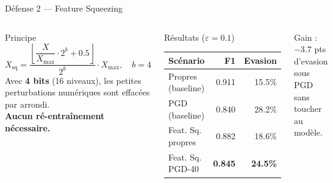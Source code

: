 \documentclass[aspectratio=169,11pt]{beamer}
\begin{document}
\begin{frame}{D\'efense 2 --- Feature Squeezing}
\begin{columns}[T]
\begin{exampleblock}{Principe}
\[
X_{\text{sq}} = \frac{\left\lfloor \dfrac{X}{X_{\max}} \cdot 2^b + 0.5 \right\rfloor}{2^b} \cdot X_{\max},
\quad b=4
\]
Avec \textbf{4 bits} (16 niveaux), les petites perturbations
num\'eriques sont effac\'ees par arrondi.\\[0.4em]
\textbf{Aucun r\'e-entra\^inement n\'ecessaire.}
\end{exampleblock}

\begin{block}{R\'esultats ($\varepsilon=0.1$)}
\footnotesize
\begin{tabular}{lrr}
\toprule
\textbf{Sc\'enario} & \textbf{F1} & \textbf{Evasion} \\
\midrule
Propres (baseline) & 0.911 & 15.5\% \\
PGD (baseline)     & 0.840 & 28.2\% \\
\midrule
\rowcolor{inptcyan!15}
Feat. Sq. propres  & 0.882 & 18.6\% \\
\rowcolor{inptcyan!30}
Feat. Sq. PGD-40   & \textbf{0.845} & \textbf{24.5\%} \\
\bottomrule
\end{tabular}
\end{block}

\vspace{0.4em}
\footnotesize
\textcolor{inptblue}{Gain : $-3.7$ pts d'evasion sous PGD sans toucher au mod\`ele.}
\end{columns}
\end{frame}
\end{document}
